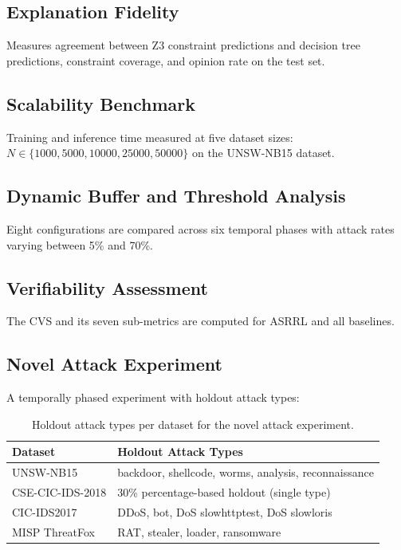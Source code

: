\documentclass[12pt, letterpaper, oneside]{report}
\newcommand{\ASRRL}{\textsc{ASRRL}}
\begin{document}
\subsection{Explanation Fidelity}

Measures agreement between Z3 constraint predictions and decision tree predictions, constraint coverage, and opinion rate on the test set.

\subsection{Scalability Benchmark}

Training and inference time measured at five dataset sizes: $N \in \{1000, 5000, 10000, 25000, 50000\}$ on the UNSW-NB15 dataset.

\subsection{Dynamic Buffer and Threshold Analysis}

Eight configurations are compared across six temporal phases with attack rates varying between 5\% and 70\%.

\subsection{Verifiability Assessment}

The CVS and its seven sub-metrics are computed for \ASRRL{} and all baselines.

\subsection{Novel Attack Experiment}

A temporally phased experiment with holdout attack types:

\begin{table}[htbp]
\centering
\caption{Holdout attack types per dataset for the novel attack experiment.}
\label{tab:holdout}
\small
\begin{tabular}{ll}
\toprule
\textbf{Dataset} & \textbf{Holdout Attack Types} \\
\midrule
UNSW-NB15 & backdoor, shellcode, worms, analysis, reconnaissance \\
CSE-CIC-IDS-2018 & 30\% percentage-based holdout (single type) \\
CIC-IDS2017 & DDoS, bot, DoS slowhttptest, DoS slowloris \\
MISP ThreatFox & RAT, stealer, loader, ransomware \\
\bottomrule
\end{tabular}
\end{table}
\end{document}
